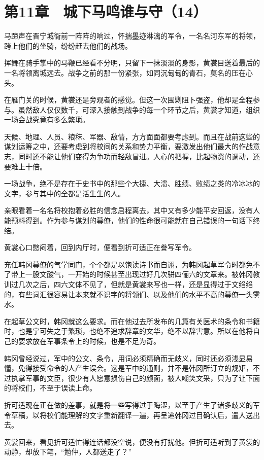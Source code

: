 \section{第11章　城下马鸣谁与守（14）}

马蹄声在晋宁城衙前一阵阵的响过，怀揣墨迹淋漓的军令，一名名河东军的将领，跨上他们的坐骑，纷纷赶去他们的战场。

挥舞在骑手掌中的马鞭已经看不分明，只留下一抹淡淡的身影，黄裳目送着最后的一名将领离城远去。战争之前的那一份紧张，如同沉甸甸的青石，莫名的压在心头。

在雁门关的时候，黄裳还是旁观者的感觉。但这一次围剿阻卜强盗，他却是全程参与。虽然敌人仅仅数千，可深入接触到战争的每一个环节之后，黄裳才知道，组织一场会战究竟有多么繁琐。

天候、地理、人员、粮秣、军器、敌情，方方面面都要考虑到。而且在战前这些的谋划运筹之中，还要考虑到将校间的关系和势力平衡，要激发出他们最大的作战意志，同时还不能让他们变得为争功而轻敌冒进。人心的把握，比起物资的调动，还要难上十倍。

一场战争，绝不是存在于史书中的那些个大捷、大溃、胜绩、败绩之类的冷冰冰的文字，参与其中的全都是活生生的人。

亲眼看着一名名将校抱着必胜的信念启程离去，其中又有多少能平安回返，没有人能预料得到。作为参与谋划的幕僚，他们的性命很可能就在自己错误的一句话下终结。

黄裳心口憋闷着，回到内厅时，便看到折可适正在誊写军令。

充任韩冈幕僚的气学同门，个个都是以饱读诗书而自诩，为韩冈起草军令时都免不了带上一股文酸气，一开始的时候甚至出现过好几次骈四俪六的文章来。被韩冈教训过几次之后，四六文体不见了，但就是黄裳来写也一样，还是显得过于文绉绉的，有些词汇很容易让本来就不识字的将领们、以及他们的水平不高的幕僚一头雾水。

在起草公文时，韩冈就这么要求。而在他过去所发布的几篇有关医术的条令和书籍时，也是宁可失之于繁琐，也绝不追求辞章的文华，绝不以辞害意。所以在他将自己的要求放在军事条令上的时候，也是不足为奇。

韩冈曾经说过，军中的公文、条令，用词必须精确而无歧义，同时还必须浅显易懂，免得接受命令的人产生误会。这是军中的通则，并不是韩冈所订立的规矩，不过执掌军事的文臣，很少有人愿意损伤自己的颜面，被人嘲笑文采，只为了让下面的将校们，不至于误读上命。

折可适现在正在做的差事，就是将一些写得过于晦涩，以至于产生了诸多歧义的军令草稿，以将校们能理解的文字重新翻译一遍，再呈递韩冈过目确认后，遣人送出去。

黄裳回来，看见折可适忙得连话都没空说，便没有打扰他。但折可适听到了黄裳的动静，却放下笔，“勉仲，人都送走了？”

